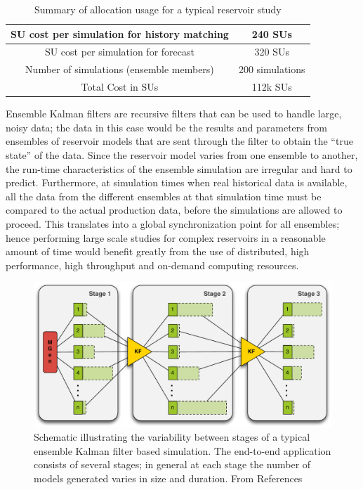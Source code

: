 \documentclass[a4paper,10pt]{article}
\begin{document}
\begin{table}[!h]
\begin{center}
 \caption{Summary of allocation usage for a typical reservoir study}
\begin{tabular}{| c | c |}
\hline
SU cost per simulation for history matching& 240 SUs \\ 
\hline
SU cost per simulation for forecast & 320 SUs \\ 
\hline
Number of simulations (ensemble members) & 200 simulations \\ 
\hline
Total Cost in SUs & 112k SUs\\
\hline
\end{tabular}
\end{center}
\end{table}

Ensemble Kalman filters are recursive filters that can be used to handle large, noisy data; the data in this case would be the results and parameters from ensembles of reservoir models that are sent through the filter to obtain the ``true state'' of the data. Since the reservoir model varies from one ensemble to another, the run-time characteristics of the ensemble simulation are irregular and hard to predict. Furthermore, at simulation times when real historical data is available, all the data from the different ensembles at that simulation time must be compared to the actual production data, before the simulations are allowed to proceed. This translates into a global synchronization point for all ensembles; hence performing large scale studies for complex reservoirs in a reasonable amount of time would benefit greatly from the use of distributed, high performance, high throughput and on-demand computing resources.

\begin{figure}
\begin{center}
\includegraphics*[scale=0.4,angle=0]{3StageKalmanFilter}
\end{center}
\caption{Schematic illustrating the variability between stages of a typical
  ensemble Kalman filter based simulation. The end-to-end
  application consists of several stages; in general at each stage the
  number of models generated varies in size and duration. From References~\cite{teragrid08, gmac}}
\label{fig:irregular_execution}
\end{figure}
\end{document}
